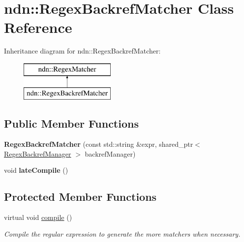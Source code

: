 \hypertarget{classndn_1_1RegexBackrefMatcher}{}\section{ndn\+:\+:Regex\+Backref\+Matcher Class Reference}
\label{classndn_1_1RegexBackrefMatcher}
Inheritance diagram for ndn\+:\+:Regex\+Backref\+Matcher\+:\begin{figure}[H]
\begin{center}
\leavevmode
\includegraphics[height=2.000000cm]{classndn_1_1RegexBackrefMatcher}
\end{center}
\end{figure}
\subsection*{Public Member Functions}
\begin{DoxyCompactItemize}
\item 
{\bfseries Regex\+Backref\+Matcher} (const std\+::string \&expr, shared\+\_\+ptr$<$ \hyperlink{classndn_1_1RegexBackrefManager}{Regex\+Backref\+Manager} $>$ backref\+Manager)\hypertarget{classndn_1_1RegexBackrefMatcher_a4d0b351be11476bc21f895ecb6638c9b}{}\label{classndn_1_1RegexBackrefMatcher_a4d0b351be11476bc21f895ecb6638c9b}

\item 
void {\bfseries late\+Compile} ()\hypertarget{classndn_1_1RegexBackrefMatcher_a15b436b06817cce491a5d99a4db746f2}{}\label{classndn_1_1RegexBackrefMatcher_a15b436b06817cce491a5d99a4db746f2}

\end{DoxyCompactItemize}
\subsection*{Protected Member Functions}
\begin{DoxyCompactItemize}
\item 
virtual void \hyperlink{classndn_1_1RegexBackrefMatcher_ab987b450f0337635c8ef10f5e7f3fd72}{compile} ()
\begin{DoxyCompactList}\small\item\em Compile the regular expression to generate the more matchers when necessary. \end{DoxyCompactList}\end{DoxyCompactItemize}
